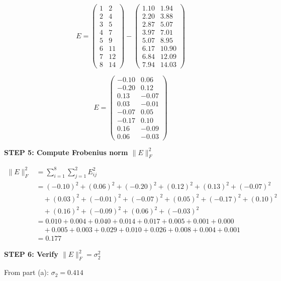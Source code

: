 \documentclass[12pt]{article}
\begin{document}
\begin{solution}
\[
E = \begin{pmatrix}
1 & 2 \\
2 & 4 \\
3 & 5 \\
4 & 7 \\
5 & 9 \\
6 & 11 \\
7 & 12 \\
8 & 14
\end{pmatrix} - \begin{pmatrix}
1.10 & 1.94 \\
2.20 & 3.88 \\
2.87 & 5.07 \\
3.97 & 7.01 \\
5.07 & 8.95 \\
6.17 & 10.90 \\
6.84 & 12.09 \\
7.94 & 14.03
\end{pmatrix}
\]

\[
E = \begin{pmatrix}
-0.10 & 0.06 \\
-0.20 & 0.12 \\
0.13 & -0.07 \\
0.03 & -0.01 \\
-0.07 & 0.05 \\
-0.17 & 0.10 \\
0.16 & -0.09 \\
0.06 & -0.03
\end{pmatrix}
\]

\textbf{STEP 5: Compute Frobenius norm $\|E\|_F^2$}

\begin{align*}
\|E\|_F^2 &= \sum_{i=1}^8 \sum_{j=1}^2 E_{ij}^2 \\
&= (-0.10)^2 + (0.06)^2 + (-0.20)^2 + (0.12)^2 + (0.13)^2 + (-0.07)^2 \\
&\quad + (0.03)^2 + (-0.01)^2 + (-0.07)^2 + (0.05)^2 + (-0.17)^2 + (0.10)^2 \\
&\quad + (0.16)^2 + (-0.09)^2 + (0.06)^2 + (-0.03)^2 \\
&= 0.010 + 0.004 + 0.040 + 0.014 + 0.017 + 0.005 + 0.001 + 0.000 \\
&\quad + 0.005 + 0.003 + 0.029 + 0.010 + 0.026 + 0.008 + 0.004 + 0.001 \\
&= 0.177
\end{align*}

\textbf{STEP 6: Verify $\|E\|_F^2 = \sigma_2^2$}

From part (a): $\sigma_2 = 0.414$


\end{solution}
\end{document}
